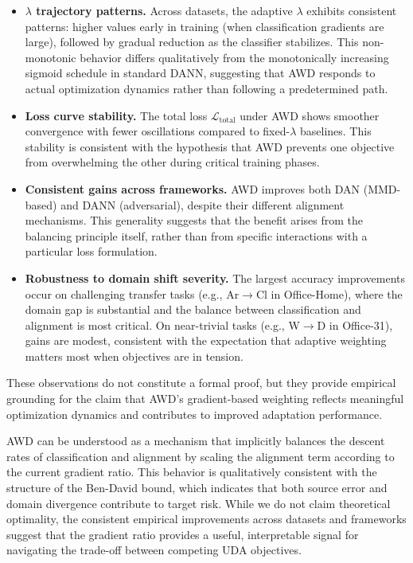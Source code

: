 \documentclass[pdflatex,sn-mathphys-num]{sn-jnl}
\theoremstyle{thmstyleone}
\theoremstyle{thmstyletwo}
\theoremstyle{thmstylethree}
\begin{document}
\begin{itemize}
    \item \textbf{$\lambda$ trajectory patterns.} Across datasets, the adaptive $\lambda$ exhibits consistent patterns: higher values early in training (when classification gradients are large), followed by gradual reduction as the classifier stabilizes. This non-monotonic behavior differs qualitatively from the monotonically increasing sigmoid schedule in standard DANN, suggesting that AWD responds to actual optimization dynamics rather than following a predetermined path.
    
    \item \textbf{Loss curve stability.} The total loss $\mathcal{L}_{\text{total}}$ under AWD shows smoother convergence with fewer oscillations compared to fixed-$\lambda$ baselines. This stability is consistent with the hypothesis that AWD prevents one objective from overwhelming the other during critical training phases.
    
    \item \textbf{Consistent gains across frameworks.} AWD improves both DAN (MMD-based) and DANN (adversarial), despite their different alignment mechanisms. This generality suggests that the benefit arises from the balancing principle itself, rather than from specific interactions with a particular loss formulation.
    
    \item \textbf{Robustness to domain shift severity.} The largest accuracy improvements occur on challenging transfer tasks (e.g., Ar$\to$Cl in Office-Home), where the domain gap is substantial and the balance between classification and alignment is most critical. On near-trivial tasks (e.g., W$\to$D in Office-31), gains are modest, consistent with the expectation that adaptive weighting matters most when objectives are in tension.
\end{itemize}

These observations do not constitute a formal proof, but they provide empirical grounding for the claim that AWD's gradient-based weighting reflects meaningful optimization dynamics and contributes to improved adaptation performance.

AWD can be understood as a mechanism that implicitly balances the descent rates of classification and alignment by scaling the alignment term according to the current gradient ratio. This behavior is qualitatively consistent with the structure of the Ben-David bound, which indicates that both source error and domain divergence contribute to target risk. While we do not claim theoretical optimality, the consistent empirical improvements across datasets and frameworks suggest that the gradient ratio provides a useful, interpretable signal for navigating the trade-off between competing UDA objectives.
\end{document}
